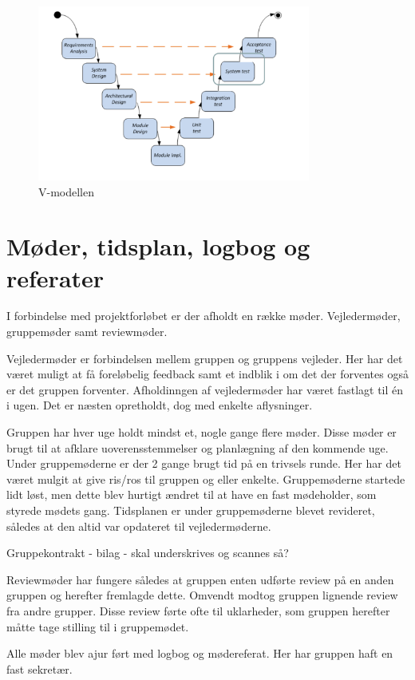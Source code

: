 \begin{figure}[htbp]
  \centering
    \includegraphics[width=0.8\textwidth]{billeder/V-modellen}
    \caption{V-modellen}
    \label{fig:V_model}
\end{figure}




\section{Møder, tidsplan, logbog og referater}

I forbindelse med projektforløbet er der afholdt en række møder. Vejledermøder, gruppemøder samt reviewmøder.

Vejledermøder er forbindelsen mellem gruppen og gruppens vejleder. Her har det været muligt at få foreløbelig feedback samt et indblik i om det der forventes også er det gruppen forventer. Afholdinngen af vejledermøder har været fastlagt til én i ugen. Det er næsten opretholdt, dog med enkelte aflysninger.

Gruppen har hver uge holdt mindst et, nogle gange flere møder. Disse møder er brugt til at afklare uoverensstemmelser og planlægning af den kommende uge. Under gruppemøderne er der 2 gange brugt tid på en trivsels runde. Her har det været mulgit at give ris/ros til gruppen og eller enkelte. Gruppemøderne startede lidt løst, men dette blev hurtigt ændret til at have en fast mødeholder, som styrede mødets gang. Tidsplanen er under gruppemøderne blevet revideret, således at den altid var opdateret til vejledermøderne.

Gruppekontrakt - bilag - skal underskrives og scannes så?

Reviewmøder har fungere således at gruppen enten udførte review på en anden gruppen og herefter fremlagde dette. Omvendt modtog gruppen lignende review fra andre grupper. Disse review førte ofte til uklarheder, som gruppen herefter måtte tage stilling til i gruppemødet.

Alle møder blev ajur ført med logbog og mødereferat. Her har gruppen haft en fast sekretær. 


  

